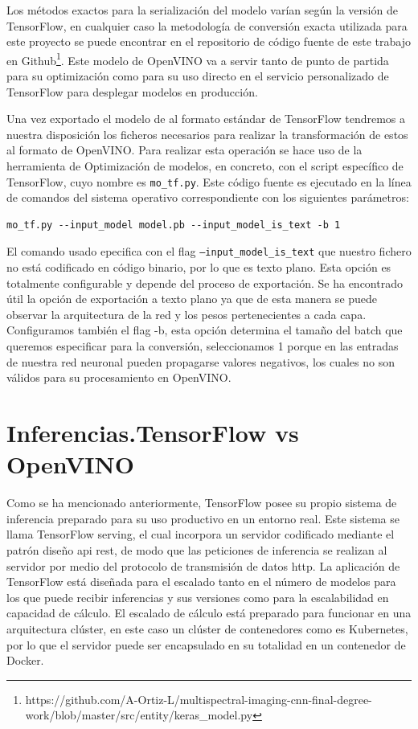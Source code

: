 Los métodos exactos para la serialización del modelo varían según la versión de TensorFlow, en cualquier caso la metodología de conversión exacta utilizada
para este proyecto se puede encontrar en el repositorio de código fuente de este trabajo en Github\footnote{https://github.com/A-Ortiz-L/multispectral-imaging-cnn-final-degree-work/blob/master/src/entity/keras\_model.py}. Este modelo de OpenVINO va a servir tanto de punto de partida para su optimización como para su uso directo en el servicio personalizado de TensorFlow para desplegar modelos en producción.

Una vez exportado el modelo de  al formato estándar de TensorFlow tendremos a nuestra disposición los ficheros necesarios para realizar la transformación de estos al formato de OpenVINO.
Para realizar esta operación se hace uso de la herramienta de Optimización de modelos, en concreto, con el script específico de TensorFlow, cuyo nombre
es \texttt{mo\_tf.py}. Este código fuente es ejecutado en la línea de comandos del sistema operativo correspondiente con los siguientes parámetros:


\begin{lstlisting}[caption=Comando de terminal para convertir un modelo TensorFlow a uno de OpenVINO.,
  label=a_label]
    mo_tf.py --input_model model.pb --input_model_is_text -b 1
\end{lstlisting}

El comando usado epecifica con el flag \texttt{--input\_model\_is\_text} que nuestro fichero no está codificado en código binario, por lo que es texto plano.
Esta opción es totalmente configurable y depende del proceso de exportación.
Se ha encontrado útil la opción de exportación a texto plano ya que de esta manera
se puede observar la arquitectura de la red y los pesos pertenecientes a cada capa.
Configuramos también el flag -b, esta opción determina el tamaño del batch que queremos especificar para la conversión, seleccionamos 1 porque en las entradas de nuestra red neuronal pueden propagarse valores
negativos, los cuales no son válidos para su procesamiento en OpenVINO\@.

\section{Inferencias.TensorFlow vs OpenVINO}\label{sec:inferencias.-TensorFlow-vs-OpenVINO}
Como se ha mencionado anteriormente, TensorFlow posee su propio sistema de inferencia preparado para su uso productivo en un entorno real. Este sistema se llama TensorFlow serving, el cual incorpora un servidor codificado mediante el patrón diseño api rest, de modo que las peticiones
de inferencia se realizan al servidor por medio del protocolo de transmisión de datos http.
La aplicación de TensorFlow está diseñada para el escalado tanto en el número de modelos para los que puede recibir inferencias y sus versiones como para la escalabilidad en capacidad de cálculo.
El escalado de cálculo está preparado para funcionar en una arquitectura clúster, en este caso un clúster de contenedores como es Kubernetes, por lo que el servidor puede ser encapsulado en su totalidad en un contenedor de Docker.

